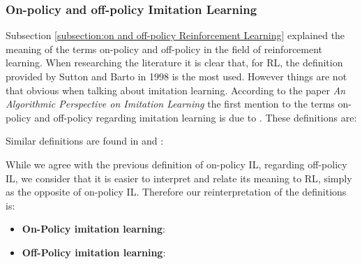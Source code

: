 \subsubsection{On-policy and off-policy Imitation Learning}
\label{subsubsection:on and off-policy Imitation Learning}

Subsection \ref{subsection:on and off-policy Reinforcement Learning} explained the meaning of the terms on-policy and off-policy in the field of reinforcement learning. When researching the literature it is clear that, for RL,  the definition provided by Sutton and Barto in 1998 is the most used. However things are not that obvious when talking about imitation learning. According to the paper \textit{An Algorithmic Perspective on Imitation Learning} \cite{Osa:2018} the first mention to the terms on-policy and off-policy regarding imitation learning is due to \cite{DBLP:journals/corr/LaskeyLHLMFG17}. These definitions are:
\setlength{\parskip}{1em} 


\setlength{\parskip}{1em} 

Similar definitions are found in \cite{OtherLaskeydefinitions:2019} and \cite{Anotherdefinitionfromberkeley:2020}:

 
\setlength{\parskip}{1em} 

While we agree with the previous definition of on-policy IL, regarding off-policy IL, we consider that it is easier to interpret and relate its meaning to RL, simply as the opposite of on-policy IL. Therefore our reinterpretation of the definitions is:  

\begin{itemize}
  \item \textbf{On-Policy imitation learning}: 
  
  \item \textbf{Off-Policy imitation learning}: 
  


\end{itemize}

